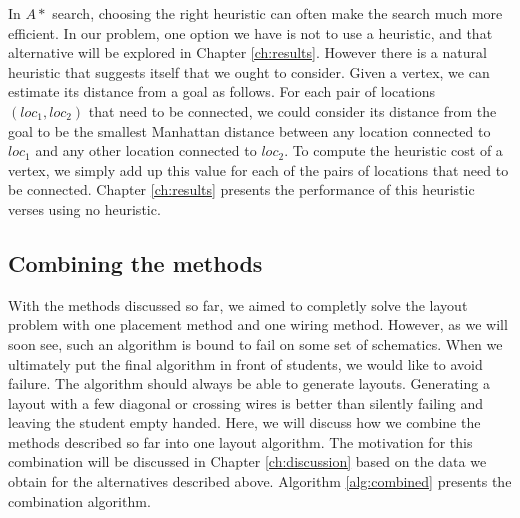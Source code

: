 In $A*$ search, choosing the right heuristic can often make the search much more
efficient. In our problem, one option we have is not to use a heuristic, and
that alternative will be explored in Chapter \ref{ch:results}. However there is
a natural heuristic that suggests itself that we ought to consider. Given a
vertex, we can estimate its distance from a goal as follows. For each pair of
locations $(loc_1, loc_2)$ that need to be connected, we could consider its
distance from the
goal to be the smallest Manhattan distance between any location connected to
$loc_1$ and any other location connected to $loc_2$. To compute the heuristic
cost of a vertex, we simply add up this value for each of the pairs of locations
that need to be connected. Chapter \ref{ch:results} presents the performance of
this heuristic verses using no heuristic.

\subsection{Combining the methods}
\label{sec:combined_alg}

With the methods discussed so far, we aimed to completly solve the layout problem
with one placement method and one wiring method. However, as we will soon see,
such an algorithm is bound to fail on some set of schematics. When we ultimately
put the final algorithm in front of students, we would like to avoid failure.
The algorithm should always be able to generate layouts. Generating a layout
with a few diagonal or crossing wires is better than silently failing and leaving
the student empty handed. Here, we will discuss how we combine the methods
described so far into one layout algorithm. The motivation for this combination
will be discussed in Chapter \ref{ch:discussion} based on the data we obtain
for the alternatives described above. Algorithm \ref{alg:combined} presents the
combination algorithm.

